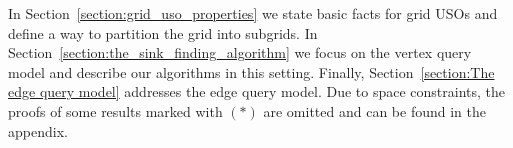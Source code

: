\documentclass[runningheads,a4paper]{llncs}
\newcommand{\AT}[1]{\marginpar{\parbox{3.6cm}{{\small {\bf AT:} #1}}}} %
\begin{document}
In Section~\ref{section:grid_uso_properties} we state basic facts for grid USOs %
and define a way to partition the grid into subgrids. %
In Section~\ref{section:the_sink_finding_algorithm} we focus on the vertex query model and describe our algorithms in this setting. Finally, Section~\ref{section:The edge query model} addresses the edge query model. 
Due to space constraints, the proofs of some results marked with $(*)$ are omitted and can be found in the appendix.







\end{document}
